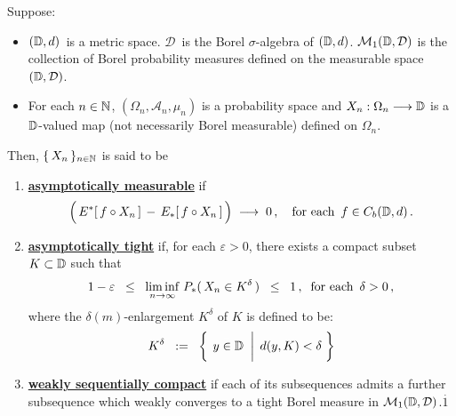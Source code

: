 \begin{definition}
\mbox{}\vskip 0.1cm
\noindent
Suppose:
\begin{itemize}
\item
	$(\mathbb{D},d)$\, is a metric space.
	$\mathcal{D}$\, is the Borel $\sigma$-algebra of $(\mathbb{D},d)$.
	\vskip 0.0cm
	$\mathcal{M}_{1}(\mathbb{D},\mathcal{D})$ is the collection of Borel probability measures
	defined on the measurable space $(\mathbb{D},\mathcal{D})$.
\item
	For each $n \in \mathbb{N}$,
	$(\Omega_{n},\mathcal{A}_{n},\mu_{n})$ is a probability space and
	$X_{n} : \Omega_{n} \longrightarrow \mathbb{D}$
	is a $\mathbb{D}$-valued map (not necessarily Borel measurable) defined on $\Omega_{n}$.
\end{itemize}
Then, $\{\,X_{n}\,\}_{n\in\mathbb{N}}$ is said to be
\begin{enumerate}
\item
	\underline{\textbf{asymptotically measurable}}\; if
	\begin{equation*}
	\left(\, \overset{{\color{white}.}}{E^{*}}\!\left[\,f \circ X_{n}\,\right] \,-\, E_{*}\!\left[\,f \circ X_{n}\,\right] \,\right)
	\;\longrightarrow\;
	0\,,
	\quad
	\textnormal{for each \,$f \in C_{b}(\D,d)$}\,.
	\end{equation*}
\item
	\underline{\textbf{asymptotically tight}}\; if, for each $\varepsilon > 0$, there exists
	a compact subset $K \subset \mathbb{D}$ such that
	\begin{equation*}
	1 - \varepsilon
	\;\; \leq \;\; \underset{n\rightarrow\infty}{\liminf}\; P_{*}(\,X_{n} \in K^{\delta}\,)
	\;\; \leq \;\; 1\,,
	\;\;
	\textnormal{for each \,$\delta > 0$}\,,
	\end{equation*}
	where the $\delta(m)$-enlargement $K^{\delta}$ of $K$ is defined to be:
	\begin{equation*}
	K^{\delta}
		\;\; := \;\;
		\left\{\;
		\left.
		y \overset{{\color{white}-}}{\in} \D
		\;\;\right\vert\;
		d(y,K) < \delta
		\;\right\}
	\end{equation*}
\item
	\underline{\textbf{weakly sequentially compact}}\; if each of its subsequences
	admits a further subsequence which weakly converges to a {\color{red}tight}
	Borel measure in $\mathcal{M}_{1}(\mathbb{D},\mathcal{D})$.{\color{white}$\overset{.}{1}$}
\end{enumerate}
\end{definition}


